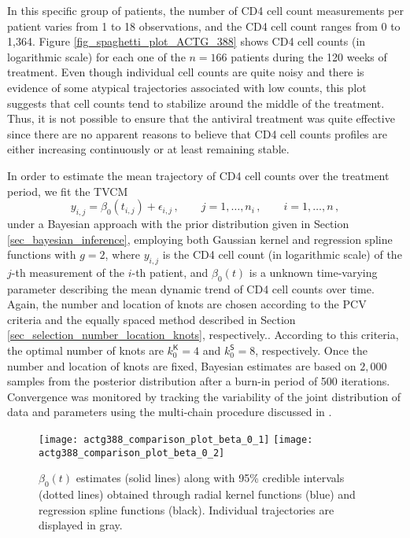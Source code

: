\documentclass[letterpaper,10pt,openany]{article}
\begin{document}
In this specific group of patients, the number of CD4 cell count measurements per patient varies from 1 to 18 observations, and the CD4 cell count ranges from 0 to 1,364. Figure \ref{fig_spaghetti_plot_ACTG_388} shows CD4 cell counts (in logarithmic scale) for each one of the $n=166$ patients during the 120 weeks of treatment. Even though individual cell counts are quite noisy and there is evidence of some atypical trajectories associated with low counts, this plot suggests that cell counts tend to stabilize around the middle of the treatment. Thus, it is not possible to ensure that the antiviral treatment was quite effective since there are no apparent reasons to believe that CD4 cell counts profiles are either increasing continuously or at least remaining stable.


In order to estimate the mean trajectory of CD4 cell counts over the treatment period, we fit the TVCM
$$y_{i,j} =\beta_0(t_{i,j}) + \epsilon_{i,j}\,, \qquad j=1,\ldots,n_i\,,\qquad i=1,\ldots,n\,,$$ 
under a Bayesian {\color{black} approach with the prior distribution given in Section \ref{sec_bayesian_inference},} employing both Gaussian kernel and regression spline functions with $g=2$, where $y_{i,j}$ is the CD4 cell count (in logarithmic scale) of the $j$-th measurement of the $i$-th patient, and $\beta_0(t)$ is a unknown time-varying parameter describing the mean dynamic trend of CD4 cell counts over time. Again, {\color{black} the number and location of knots are chosen according to the \textsf{PCV} criteria and the equally spaced method described in Section \ref{sec_selection_number_location_knots}, respectively.}. According to this criteria, the optimal number of knots are $k_0^{\textsf{K}} = 4$ and $k_0^{\textsf{S}} = 8$, respectively. {\color{black} Once the number and location of knots are fixed, Bayesian estimates are based on $2,000$ samples from the posterior distribution after a burn-in period of 500 iterations.}  Convergence was monitored by tracking the variability of the joint distribution of data and parameters using the multi-chain procedure discussed in \cite{GeRu92}.


\begin{figure}[!h]
	\centering
	\texttt{[image: actg388\_comparison\_plot\_beta\_0\_1]}
	\texttt{[image: actg388\_comparison\_plot\_beta\_0\_2]}
	\caption{$\beta_0(t)$ estimates (solid lines) along with 95\% credible intervals (dotted lines) obtained through radial kernel functions (blue) and regression spline functions (black). Individual trajectories are displayed in gray.}\label{fig_fitted_curve_ACTG_388}
\end{figure}
\end{document}

